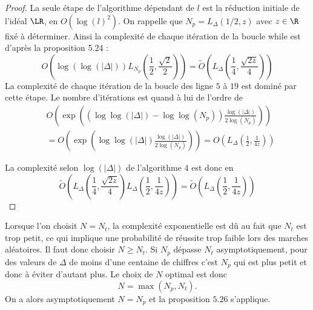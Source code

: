 \begin{proof}
	 La seule étape de l'algorithme dépendant de $l$ est la réduction initiale de l'idéal $\LR$, en $O(\log(l)^2)$. On rappelle que $N_{p} = L_\Delta(1/2,z)$ avec $z\in\R$ fixé à déterminer. Ainsi la complexité de chaque itération de la boucle while est d'après la proposition 5.24 :
	\begin{equation*}
		O\left( \log(\log(|\Delta|))L_{N_p}\left( \frac{1}{2},\frac{\sqrt{2}}{2}\right) \right) = \tilde{O}\left(  L_\Delta\left( \frac{1}{4}, \frac{\sqrt{2z}}{4} \right) \right) 
	\end{equation*}
	La complexité de chaque itération de la boucle des ligne $5$ à $19$ est dominé par cette étape. Le nombre d'itérations est quand à lui de l'ordre de 
	\begin{align*}
		&O\left( \exp \left( \left( \log\log\left(|\Delta| \right) - \log\log\left( N_{p} \right)  \right)\frac{\log\left(|\Delta| \right)}{2\log\left( N_{p} \right)} \right) \right) \\&= O\left( \exp \left( \log\log\left(|\Delta|  \right)\frac{\log\left(|\Delta| \right)}{2\log\left( N_{p} \right)} \right) \right) = O\left( L_\Delta\left( \frac{1}{2},\frac{1}{4z}\right) \right) 
	\end{align*}
	
	La complexité selon $\log(|\Delta|)$ de l'algorithme $4$ est donc en 
	\begin{equation*}
		\tilde{O}\left(  L_\Delta\left( \frac{1}{4},\frac{\sqrt{2z}}{4}\right)L_\Delta\left( \frac{1}{2},\frac{1}{4z}\right)\right)  = \tilde{O}\left( L_\Delta\left(\frac{1}{2}, \frac{1}{4z} \right) \right) 
	\end{equation*}
	
\end{proof}


\begin{Rem}
	Lorsque l'on choisit $N = N_t$, la complexité exponentielle est dû au fait que $N_t$ est trop petit, ce qui implique une probabilité de réussite trop faible lors des marches aléatoires. Il faut donc choisir $N \geq N_t$. Si $N_p$ dépasse $N_t$ asymptotiquement, pour des valeurs de $\Delta$ de moins d'une centaine de chiffres c'est $N_p$ qui est plus petit et donc à éviter d'autant plus. Le choix de $N$ optimal est donc
	\begin{equation*}
		N = \max(N_p,N_t).
	\end{equation*}
	On a alors asymptotiquement $N = N_p$ et la proposition $5.26$ s'applique. 
\end{Rem}




